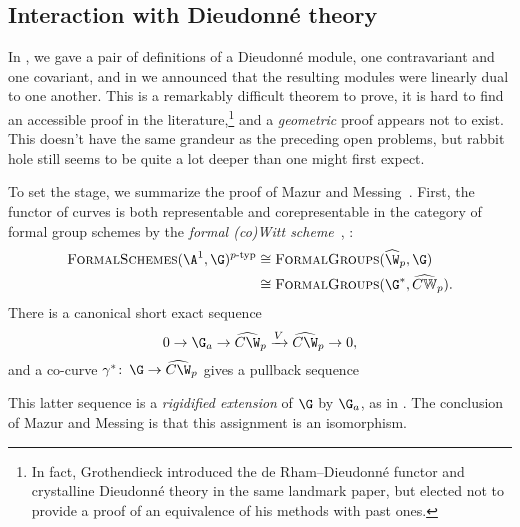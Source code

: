 \subsection*{Interaction with Dieudonn\'e theory}

In , we gave a pair of definitions of a Dieudonn\'e module, one contravariant and one covariant, and in  we announced that the resulting modules were linearly dual to one another.  This is a remarkably difficult theorem to prove, it is hard to find an accessible proof in the literature,\footnote{In fact, Grothendieck introduced the de Rham--Dieudonn\'e functor and crystalline Dieudonn\'e theory in the same landmark paper, but elected not to provide a proof of an equivalence of his methods with past ones.} and a \emph{geometric} proof appears not to exist.  This doesn't have the same grandeur as the preceding open problems, but rabbit hole still seems to be quite a lot deeper than one might first expect.

To set the stage, we summarize the proof of Mazur and Messing~\cite[Section II.15]{MazurMessing}.  First, the functor of curves is both representable and corepresentable in the category of formal group schemes by the \textit{formal (co)Witt scheme}~\cite[Chapter 3]{ZinkCartierTheory}, \cite[Section III.4]{LazardCFGs}:
\begin{align*}
\CatOf{FormalSchemes}(\A^1, \G)^{\ptyp} & \cong \CatOf{FormalGroups}(\widehat{\W}_p, \G) \\
& \cong \CatOf{FormalGroups}(\G^*, \widehat{C\mathbb W}_p).
\end{align*}
There is a canonical short exact sequence \[0 \to \G_a \to \widehat{C\W}_p \xrightarrow{V} \widehat{C\W}_p \to 0,\] and a co-curve \(\gamma^*\co \G \to \widehat{C\W}_p\) gives a pullback sequence
\begin{center}
\end{center}
This latter sequence is a \textit{rigidified extension} of \(\G\) by \(\G_a\), as in .  The conclusion of Mazur and Messing is that this assignment is an isomorphism.

